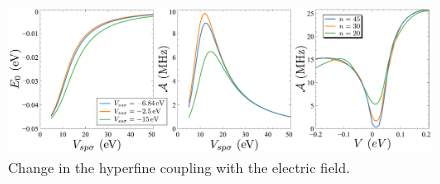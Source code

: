 %
%
%
%
%
%

\begin{figure}[h!]
\centering
\includegraphics{artlat/fig/hyperfine.pdf}
\vspace{-20pt}
\caption{Change in the hyperfine coupling with the electric field.}
\label{latt_hyper}
\end{figure}
\FloatBarrier



